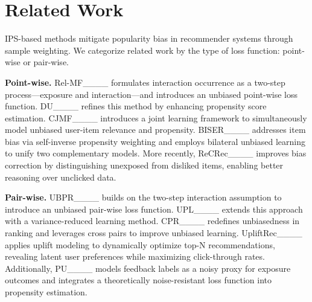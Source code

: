 \section{Related Work}
\label{sec:dnm9}
IPS-based methods mitigate popularity bias in recommender systems through sample weighting.
We categorize related work by the type of loss function: point-wise or pair-wise.

\textbf{Point-wise.}
Rel-MF____ formulates interaction occurrence as a two-step process---exposure and interaction---and introduces an unbiased point-wise loss function.
DU____ refines this method by enhancing propensity score estimation.
CJMF____ introduces a joint learning framework to simultaneously model unbiased user-item relevance and propensity.
BISER____ addresses item bias via self-inverse propensity weighting and employs bilateral unbiased learning to unify two complementary models.
More recently, ReCRec____ improves bias correction by distinguishing unexposed from disliked items, enabling better reasoning over unclicked data.

\textbf{Pair-wise.}
UBPR____ builds on the two-step interaction assumption to introduce an unbiased pair-wise loss function.
UPL____ extends this approach with a variance-reduced learning method.
CPR____ redefines unbiasedness in ranking and leverages cross pairs to improve unbiased learning.
UpliftRec____ applies uplift modeling to dynamically optimize top-N recommendations, revealing latent user preferences while maximizing click-through rates.
Additionally, PU____ models feedback labels as a noisy proxy for exposure outcomes and integrates a theoretically noise-resistant loss function into propensity estimation.